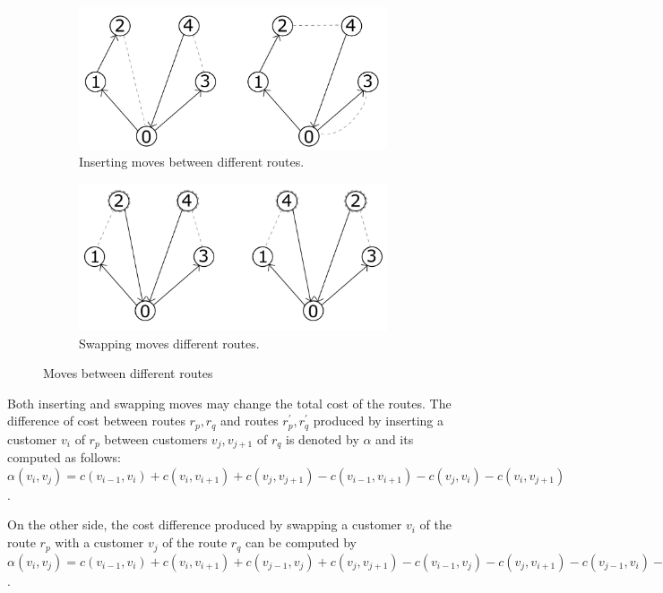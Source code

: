 \begin{figure}[H]
\begin{subfigure}{.5\textwidth}
	\centering
	\includegraphics[width=.8\linewidth]{./img/join.jpg} 
	\caption{Inserting moves between different routes.}
	\label{ExInsertingMove}
\end{subfigure}
\begin{subfigure}{.5\textwidth}
	\centering
	\includegraphics[width=.8\linewidth]{./img/swap.jpg} 
	\caption{Swapping moves different routes.}
	\label{ExSwappingMove}
\end{subfigure}
\caption{Moves between different routes}
\label{moves2}
\end{figure}


Both inserting and swapping moves may change the total cost of the routes. The difference of cost between routes $r_{p},r_{q}$ and routes $r_{p}^{'},r_{q}^{'}$ produced by inserting a customer $v_i$ of $r_p$ between customers $v_j, v_{j+1}$ of $r_q$ is denoted by $\alpha$ and its computed as follows:
$\alpha(v_{i},v_{j}) = c(v_{i-1},v_{i}) + c(v_{i},v_{i+1}) + c(v_{j},v_{j+1}) -c (v_{i-1},v_{i+1}) -c (v_{j},v_{i})- c(v_{i},v_{j+1})$.

On the other side, the cost difference produced by swapping a customer $v_i$ of the route $r_p$ with a customer $v_j$ of the route $r_q$ can be computed by
$\alpha(v_{i},v_{j}) = c(v_{i-1},v_{i}) + c(v_{i},v_{i+1}) + c(v_{j-1},v_{j})  + c(v_{j},v_{j+1}) 
-c (v_{i-1},v_{j}) -c (v_{j},v_{i+1})- c(v_{j-1},v_{i}) -  c(v_{i},v_{j+1})$.


